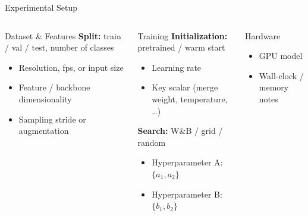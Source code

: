 \documentclass[9pt,aspectratio=169]{beamer}
\begin{document}
\begin{frame}{Experimental Setup}
  \begin{columns}[T,onlytextwidth]
      \begin{block}{Dataset \& Features}
        \textbf{Split:} train / val / test, number of classes
        \begin{itemize}
          \item Resolution, fps, or input size
          \item Feature / backbone dimensionality
          \item Sampling stride or augmentation
        \end{itemize}
      \end{block}

      \begin{block}{Training}
        \textbf{Initialization:} pretrained / warm start
        \begin{itemize}
          \item Learning rate
          \item Key scalar (merge weight, temperature, \ldots)
        \end{itemize}

        \textbf{Search:} W\&B / grid / random
        \begin{itemize}
          \item Hyperparameter A: $\{a_1, a_2\}$
          \item Hyperparameter B: $\{b_1, b_2\}$
        \end{itemize}
      \end{block}

      \begin{block}{Hardware}
        \begin{itemize}
          \item GPU model
          \item Wall-clock / memory notes
        \end{itemize}
      \end{block}
  \end{columns}
\end{frame}
\end{document}
